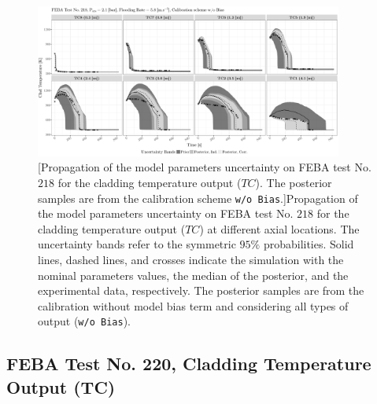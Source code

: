 \clearpage
\begin{figure}
	\centering
	\includegraphics[width=0.90\textwidth]{../figures/chapter5/figures/plotTraceUQPosteriorAllNoDiscNoBCTC218}
		[Propagation of the model parameters uncertainty on FEBA test No. $218$ for the cladding temperature output ($TC$). The posterior samples are from the calibration scheme \texttt{w/o Bias}.]{Propagation of the model parameters uncertainty on FEBA test No. $218$ for the cladding temperature output ($TC$) at different axial locations. The uncertainty bands refer to the symmetric $95\%$ probabilities. Solid lines, dashed lines, and crosses indicate the simulation with the nominal parameters values, the median of the posterior, and the experimental data, respectively. The posterior samples are from the calibration without model bias term and considering all types of output (\texttt{w/o Bias}).}
	\label{fig:ch5_plot_trace_uq_post_tc_218_nodisc}
\end{figure}
\clearpage

\subsection{FEBA Test No. 220, Cladding Temperature Output (TC)}\label{app:tbl_results_uq_post_tc_220}

